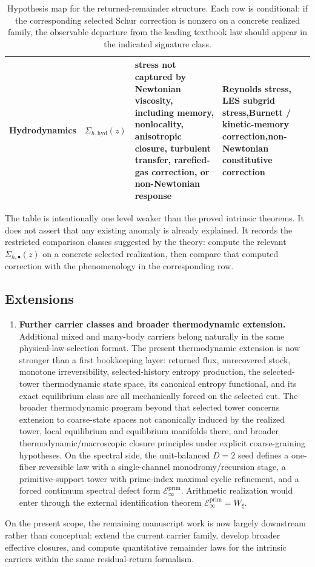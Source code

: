 \begin{table}[ht]
\begin{tabular}{@{}P{1.6cm}P{2.7cm}P{4.7cm}P{4.5cm}@{}}
Hydro\-dynamics
& \(\Sigma_{h,\mathrm{hyd}}(z)\)
& stress not captured by Newtonian viscosity, including memory, nonlocality,
  anisotropic closure, turbulent transfer, rarefied-gas correction, or
  non-Newtonian response
& Reynolds stress, LES subgrid stress,\newline Burnett / kinetic-memory
  correction,\newline non-Newtonian constitutive correction \\
\bottomrule
\end{tabular}
\caption{Hypothesis map for the returned-remainder structure. Each row is
conditional: if the corresponding selected Schur correction is nonzero on a
concrete realized family, the observable departure from the leading textbook
law should appear in the indicated signature class.}
\label{tab:returned-remainder-phenomenology}
\end{table}

The table is intentionally one level weaker than the proved intrinsic theorems.
It does not assert that any existing anomaly is already explained. It records
the restricted comparison classes suggested by the theory: compute the relevant
\(\Sigma_{h,\bullet}(z)\) on a concrete selected realization, then compare that
computed correction with the phenomenology in the corresponding row.

\subsection{Extensions}

\begin{enumerate}[leftmargin=1.2em, itemsep=0.3em]
\item \textbf{Further carrier classes and broader thermodynamic extension.} Additional
      mixed and many-body carriers belong naturally in the same
      physical-law-selection format. The present thermodynamic extension is now
      stronger than a first bookkeeping layer: returned flux, unrecovered
      stock, monotone irreversibility, selected-history entropy production, the
      selected-tower thermodynamic state space, its canonical entropy
      functional, and its exact equilibrium class are all mechanically forced
      on the selected cut. The broader thermodynamic program beyond that
      selected tower concerns extension to coarse-state spaces not
      canonically induced by the realized tower, local equilibrium and
      equilibrium manifolds there, and broader
      thermodynamic/macroscopic closure principles under explicit
      coarse-graining hypotheses.
      On the spectral side, the unit-balanced \(D=2\) seed defines a
      one-fiber reversible law with a single-channel monodromy/recursion
      stage, a primitive-support tower with prime-index maximal cyclic
      refinement, and a forced continuum spectral defect form
      \(\mathcal E_{\infty}^{\mathrm{prim}}\). Arithmetic realization would
      enter through the external identification theorem
      \(\mathcal E_{\infty}^{\mathrm{prim}} = W_{\xi}\).
\end{enumerate}

On the present scope, the remaining manuscript work is now largely
downstream rather than conceptual: extend the current carrier family, develop
broader effective closures, and compute quantitative remainder laws for the
intrinsic carriers within the same residual-return formalism.
